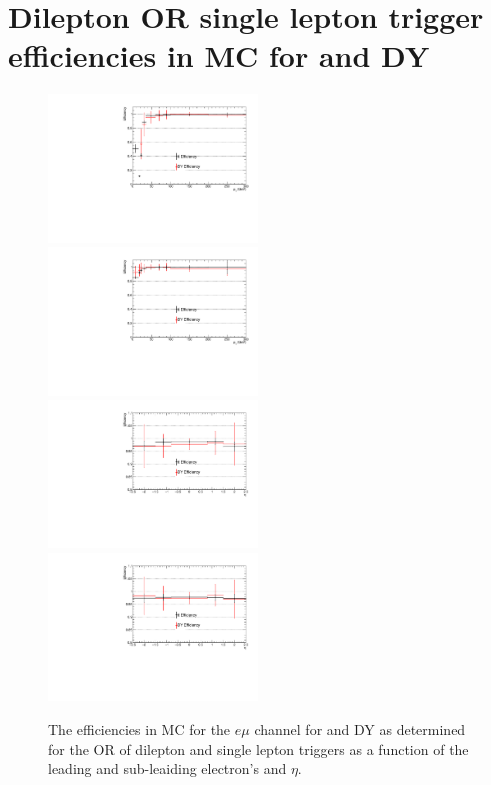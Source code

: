 \clearpage
\newpage

\section{Dilepton OR single lepton trigger efficiencies in MC for \ttbar and DY} \label{appSec:triggerSystPlots}

\begin{figure}[ht]
\centering
\includegraphics[width=0.495\textwidth]{figs/background-estimation/triggerEfficiency/DY/electron1_pT_eff.pdf}
\includegraphics[width=0.495\textwidth]{figs/background-estimation/triggerEfficiency/DY/electron2_pT_eff.pdf}
\\
\includegraphics[width=0.495\textwidth]{figs/background-estimation/triggerEfficiency/DY/electron1_eta_eff.pdf}
\includegraphics[width=0.495\textwidth]{figs/background-estimation/triggerEfficiency/DY/electron2_eta_eff.pdf}
\caption{
The efficiencies in MC for the $e\mu$ channel for \ttbar and DY as determined for the OR of dilepton and single lepton triggers as a function of the leading and sub-leaiding electron's \pT and $\eta$.
}
\label{fig:App_trigSyst_ee}
\end{figure}

